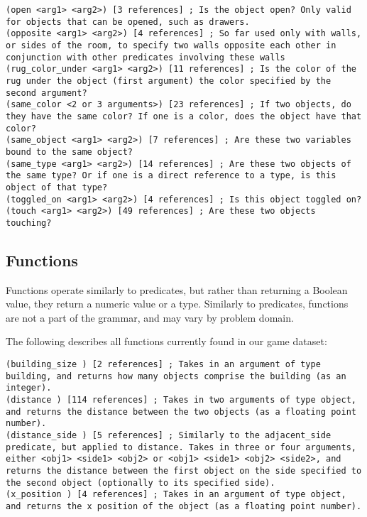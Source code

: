 \documentclass{article}
\begin{document}
\begin{lstlisting}
(open <arg1> <arg2>) [3 references] ; Is the object open? Only valid for objects that can be opened, such as drawers.
(opposite <arg1> <arg2>) [4 references] ; So far used only with walls, or sides of the room, to specify two walls opposite each other in conjunction with other predicates involving these walls
(rug_color_under <arg1> <arg2>) [11 references] ; Is the color of the rug under the object (first argument) the color specified by the second argument?
(same_color <2 or 3 arguments>) [23 references] ; If two objects, do they have the same color? If one is a color, does the object have that color?
(same_object <arg1> <arg2>) [7 references] ; Are these two variables bound to the same object?
(same_type <arg1> <arg2>) [14 references] ; Are these two objects of the same type? Or if one is a direct reference to a type, is this object of that type?
(toggled_on <arg1> <arg2>) [4 references] ; Is this object toggled on?
(touch <arg1> <arg2>) [49 references] ; Are these two objects touching?
\end{lstlisting}



\subsection{Functions} \label{sec:functions}
Functions operate similarly to predicates, but rather than returning a Boolean value, they return a numeric value or a type. 
Similarly to predicates, functions are not a part of the grammar, and may vary by problem domain. 

The following describes all functions currently found in our game dataset:
\begin{lstlisting}
(building_size ) [2 references] ; Takes in an argument of type building, and returns how many objects comprise the building (as an integer).
(distance ) [114 references] ; Takes in two arguments of type object, and returns the distance between the two objects (as a floating point number).
(distance_side ) [5 references] ; Similarly to the adjacent_side predicate, but applied to distance. Takes in three or four arguments, either <obj1> <side1> <obj2> or <obj1> <side1> <obj2> <side2>, and returns the distance between the first object on the side specified to the second object (optionally to its specified side).
(x_position ) [4 references] ; Takes in an argument of type object, and returns the x position of the object (as a floating point number).
\end{lstlisting}
\end{document}

